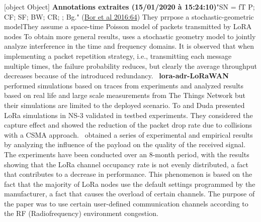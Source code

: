  \cite{ochoa_large_2018}    \newline 
 \cite{orfanidis_investigating_2017}    \newline 
 \cite{piva_impact_2017}    \newline 
 \cite{rezende_adaptive_2018}    \newline 
 \cite{sandoval_optimal_2018}    \newline 
 \cite{zhou_novel_2019}    \newline 
 \cite{zhu_improving_2019}    \newline 
 \cite{zorbas_improving_2018}    \newline 
 \cite{gupta_battery_2019}   [object Object]   \newline 
 \cite{bor_lora_2016}   \textbf{Annotations extraites (15/01/2020 \`a 15:24:10)}"SN = fT P; CF; SF; BW; CR; ; Bg." (\href{zotero://open-pdf/library/items/I4JZZ98I?page=6}{Bor et al 2016:64})   \newline 
 \cite{blaszczyszyn_analyzing_2019}   They prrpose a stochastic-geometric modelThey assume a space-time Poisson model of packets transmitted by LoRA nodes   \newline 
 \cite{li_2d_2016}   To obtain more general results, \cite{li_2d_2016} uses a stochastic geometry model to jointly analyze interference in the time and frequency domains. It is observed that when implementing a packet repetition strategy, i.e., transmitting each message multiple times, the failure probability reduces, but clearly the average throughput decreases because of the introduced redundancy.~   \newline 
\textbf{lora-adr-LoRaWAN} \newline  \cite{blenn_lorawan_2017}   \citet{blenn_lorawan_2017} performed simulations based on traces from experiments and analyzed results based on real life and large scale measurements from The Things Network but their simulations are limited to the deployed scenario. To and Duda \cite{to_simulation_2018} presented LoRa simulations in NS-3 validated in testbed experiments. They considered the capture effect and showed the reduction of the packet drop rate due to collisions with a CSMA approach.~\citet{blenn_lorawan_2017} obtained a series of experimental and empirical results by analyzing the influence of the payload on the quality of the received signal. The experiments have been conducted over an 8-month period, with the results showing that the LoRa channel occupancy rate is not evenly distributed, a fact that contributes to a decrease in performance. This phenomenon is based on the fact that the majority of LoRa nodes use the default settings programmed by the manufacturer, a fact that causes the overload of certain channels. The purpose of the paper was to use certain user-defined communication channels according to the RF (Radiofrequency) environment congestion.~   \newline 
